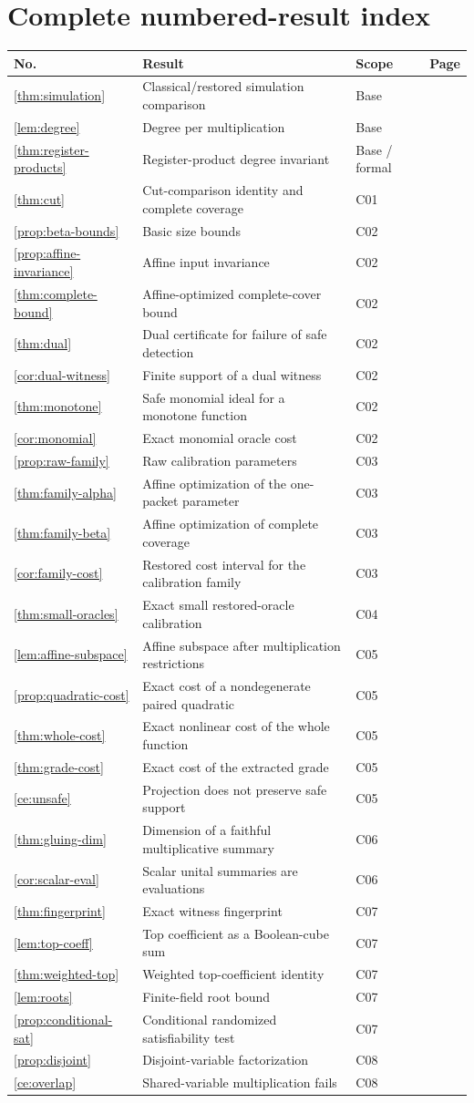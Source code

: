 \documentclass[11pt,letterpaper,oneside]{report}
\theoremstyle{komorebi}
\newcommand{\resultrow}[4]{\ref{#1} & #2 & #3 & \pageref{#1}\\}
\begin{document}
\section{Complete numbered-result index}
\small
\begin{longtable}{@{}>{\RaggedRight\arraybackslash}p{0.40in}>{\RaggedRight\arraybackslash}p{4.15in}>{\RaggedRight\arraybackslash}p{0.74in}r@{}}
\toprule
\textbf{No.} & \textbf{Result} & \textbf{Scope} & \textbf{Page}\\\midrule\endhead
\resultrow{thm:simulation}{Classical/restored simulation comparison}{Base}{}
\resultrow{lem:degree}{Degree per multiplication}{Base}{}
\resultrow{thm:register-products}{Register-product degree invariant}{Base / formal}{}
\resultrow{thm:cut}{Cut-comparison identity and complete coverage}{C01}{}
\resultrow{prop:beta-bounds}{Basic size bounds}{C02}{}
\resultrow{prop:affine-invariance}{Affine input invariance}{C02}{}
\resultrow{thm:complete-bound}{Affine-optimized complete-cover bound}{C02}{}
\resultrow{thm:dual}{Dual certificate for failure of safe detection}{C02}{}
\resultrow{cor:dual-witness}{Finite support of a dual witness}{C02}{}
\resultrow{thm:monotone}{Safe monomial ideal for a monotone function}{C02}{}
\resultrow{cor:monomial}{Exact monomial oracle cost}{C02}{}
\resultrow{prop:raw-family}{Raw calibration parameters}{C03}{}
\resultrow{thm:family-alpha}{Affine optimization of the one-packet parameter}{C03}{}
\resultrow{thm:family-beta}{Affine optimization of complete coverage}{C03}{}
\resultrow{cor:family-cost}{Restored cost interval for the calibration family}{C03}{}
\resultrow{thm:small-oracles}{Exact small restored-oracle calibration}{C04}{}
\resultrow{lem:affine-subspace}{Affine subspace after multiplication restrictions}{C05}{}
\resultrow{prop:quadratic-cost}{Exact cost of a nondegenerate paired quadratic}{C05}{}
\resultrow{thm:whole-cost}{Exact nonlinear cost of the whole function}{C05}{}
\resultrow{thm:grade-cost}{Exact cost of the extracted grade}{C05}{}
\resultrow{ce:unsafe}{Projection does not preserve safe support}{C05}{}
\resultrow{thm:gluing-dim}{Dimension of a faithful multiplicative summary}{C06}{}
\resultrow{cor:scalar-eval}{Scalar unital summaries are evaluations}{C06}{}
\resultrow{thm:fingerprint}{Exact witness fingerprint}{C07}{}
\resultrow{lem:top-coeff}{Top coefficient as a Boolean-cube sum}{C07}{}
\resultrow{thm:weighted-top}{Weighted top-coefficient identity}{C07}{}
\resultrow{lem:roots}{Finite-field root bound}{C07}{}
\resultrow{prop:conditional-sat}{Conditional randomized satisfiability test}{C07}{}
\resultrow{prop:disjoint}{Disjoint-variable factorization}{C08}{}
\resultrow{ce:overlap}{Shared-variable multiplication fails}{C08}{}
\bottomrule
\end{longtable}
\normalsize
\end{document}
